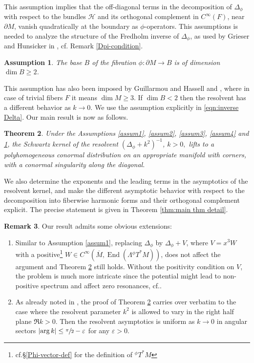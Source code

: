 \documentclass[11pt]{article}
\newcommand{\cf}{cf.\xspace}
\numberwithin{equation}{section}
\theoremstyle{plain}
\newtheorem{Th}{Theorem}[section]
\newtheorem{assum}[Th]{Assumption}
\theoremstyle{definition}
\newtheorem{Rem}[Th]{Remark}
\DeclareMathOperator{\End}{End}
\newcommand{\Cinf}{C^\infty}
\newcommand{\dM}{{\partial M}}
\newcommand{\Mbar}{{\overline{M}}}\let\M\Mbar
\let\eps\varepsilon
\begin{document}
This assumption implies that the off-diagonal terms in the decomposition of $\Delta_{\phi}$ with respect to the bundles $\mathscr{H}$ and its orthogonal complement in $\Cinf(F)$, near $\dM$, vanish quadratically at the boundary as $\phi$-operators. This assumptions is needed to analyze the structure of the Fredholm inverse of $\Delta_{\phi}$, as
used by Grieser and Hunsicker in \cite[Th.\,2]{grieser-para}, \cf Remark \ref{Dpi-condition}.

\begin{assum}\label{assum5}
The base $B$ of the fibration $\phi: \partial M \!\to\! B$ is of dimension \hbox{$\dim B \!\geq\! 2$}.
\end{assum}

This assumption has also been imposed by Guillarmou and Hassell
\cite{guillarmou2008resolvent} and \cite{guillarmou2009resolvent}, where
in case of trivial fibers $F$ it means $\dim M \geq 3$. If $\dim B<2$ then the resolvent has a different behavior as $k\to0$. We use the assumption explicitly in \eqref{eqn:inverse Delta}. Our main result is now as follows.

\begin{Th}\label{main-theorem-intro}
Under the Assumptions \ref{assum1}, \ref{assum2}, \ref{assum3}, \ref{assum4} and \ref{assum5},
the Schwartz kernel of the resolvent
$(\Delta_{\phi} + k^{2})^{-1}$, $k>0,$ lifts to a polyhomogeneous conormal
distribution on an appropriate manifold with corners,
with a conormal singularity along the diagonal.
\end{Th}
We also determine the exponents and the leading terms in the asymptotics of the resolvent kernel, and make the different asymptotic behavior with respect to the decomposition into fiberwise harmonic forms and their orthogonal complement explicit. The precise statement is given in Theorem \ref{thm:main thm detail}.

\begin{Rem}
Our result admits some obvious extensions:
\begin{enumerate}
\item Similar to Assumption \ref{assum1}, replacing $\Delta_\phi$ by $\Delta_\phi + V$, where
$V = x^3 W$ with a positive\footnote{\cf \S \ref{Phi-vector-def} for the definition of ${}^{\phi}T^*M$} $W \in C^\infty(\Mbar, \End(\Lambda{}^{\phi}T^*M))$,
does not affect the argument and Theorem \ref{main-theorem-intro} still holds. Without the positivity condition on $V$, the problem is much more
intricate since the potential might lead to non-positive spectrum and affect zero resonances, \cf \cite{guillarmou2009resolvent}.
\item As already noted in \cite[Th.\,6]{Sher}, the proof of Theorem \ref{main-theorem-intro} carries over verbatim to
the case where the resolvent parameter $k^2$ is allowed to vary in the right half plane $\Re k>0$. Then
the resolvent asymptotics is
uniform as $k\to0$ in angular sectors $\left|\arg k\right| \leq \sfrac\pi2-\eps$ for any $\eps>0$.
\end{enumerate}
\end{Rem}
\end{document}
